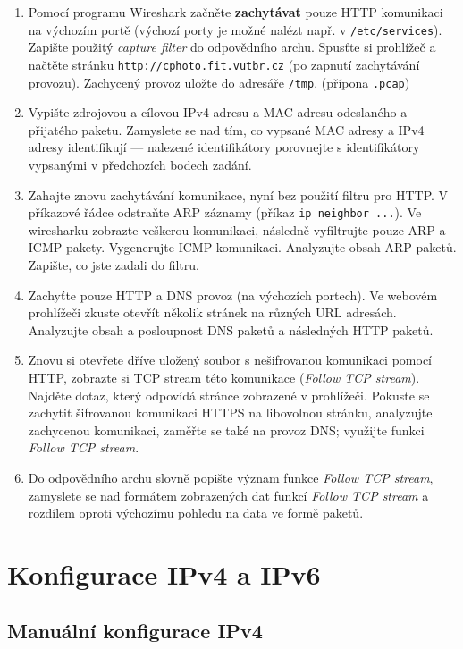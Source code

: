 \begin{enumerate}
  \item Pomocí programu Wireshark začněte \textbf{zachytávat} pouze HTTP komunikaci na výchozím portě
    (výchozí porty je možné nalézt např. v \texttt{/etc/services}). Zapište
    použitý \emph{capture filter} do odpovědního archu. Spusťte si prohlížeč a
    načtěte stránku \texttt{http://cphoto.fit.vutbr.cz} (po zapnutí zachytávání
    provozu). Zachycený provoz uložte do adresáře \texttt{/tmp}. (přípona \texttt{.pcap})
\item Vypište zdrojovou a cílovou IPv4 adresu a MAC adresu odeslaného a
  přijatého paketu. Zamyslete se nad tím, co vypsané MAC adresy a IPv4 adresy
    identifikují --- nalezené identifikátory porovnejte s identifikátory
    vypsanými v předchozích bodech zadání.
\item Zahajte znovu zachytávání komunikace, nyní bez použití filtru pro HTTP. V příkazové řádce odstraňte ARP záznamy (příkaz \texttt{ip neighbor ...}). Ve wiresharku zobrazte veškerou komunikaci, následně vyfiltrujte pouze ARP a ICMP pakety. Vygenerujte ICMP komunikaci. Analyzujte obsah ARP paketů. Zapište, co jste zadali do filtru.
\item Zachyťte pouze HTTP a DNS provoz (na výchozích portech). Ve webovém prohlížeči zkuste otevřít několik stránek na různých URL adresách. Analyzujte obsah a posloupnost DNS paketů a následných HTTP paketů.
\item Znovu si otevřete dříve uložený soubor s nešifrovanou komunikaci pomocí
  HTTP, zobrazte si TCP stream této komunikace (\emph{Follow TCP stream}).
    Najděte dotaz, který odpovídá stránce zobrazené v prohlížeči. Pokuste se
    zachytit šifrovanou komunikaci HTTPS na libovolnou stránku, analyzujte
    zachycenou komunikaci, zaměřte se také na provoz DNS; využijte funkci \emph{Follow TCP stream}.
\item Do odpovědního archu slovně popište význam funkce \emph{Follow TCP stream},
    zamyslete se nad formátem zobrazených dat funkcí \emph{Follow TCP stream} a
    rozdílem oproti výchozímu pohledu na data ve formě paketů.
\end{enumerate}

\section{Konfigurace IPv4 a IPv6}

\subsection{Manuální konfigurace IPv4}

